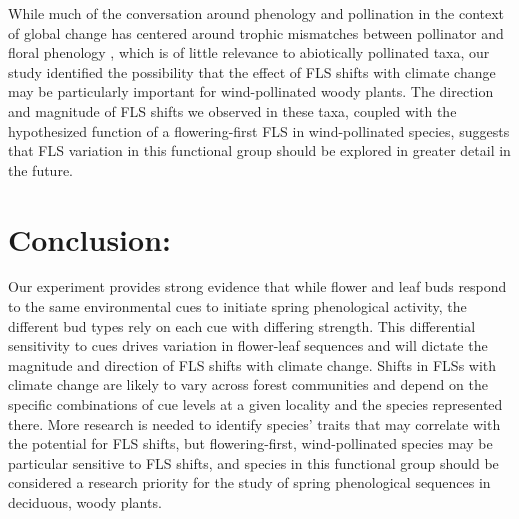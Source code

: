 \documentclass[11pt]{article}
\begin{document}
\noindent While much of the conversation around phenology and pollination in the context of global change has centered around trophic mismatches between pollinator and floral phenology \citep{Memmott2007}, which is of little relevance to abiotically pollinated taxa, our study identified the possibility that the effect of FLS shifts with climate change may be particularly important for wind-pollinated woody plants. The direction and magnitude of FLS shifts we observed in these taxa, coupled with the hypothesized function of a flowering-first FLS in wind-pollinated species, suggests that FLS variation in this functional group should be explored in greater detail in the future.

\section*{Conclusion:}
\noindent Our experiment provides strong evidence that while flower and leaf buds respond to the same environmental cues to initiate spring phenological activity, the different bud types rely on each cue with differing strength. This differential sensitivity to cues drives variation in flower-leaf sequences and will dictate the magnitude and direction of FLS shifts with climate change. Shifts in FLSs with climate change are likely to vary across forest communities and depend on the specific combinations of cue levels at a given locality and the species represented there. More research is needed to identify species' traits that may correlate with the potential for FLS shifts, but flowering-first, wind-pollinated species may be particular sensitive to FLS shifts, and species in this functional group should be considered a research priority for the study of spring phenological sequences in deciduous, woody plants. \\

 
\end{document}
